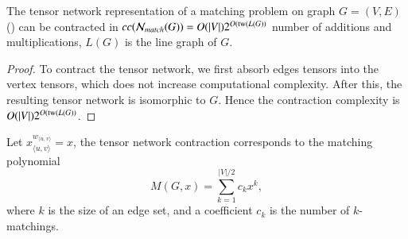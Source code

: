 \documentclass[review, onefignum, onetabnum]{siamart190516}
\begin{document}
\begin{theorem}\label{thm:matchcomplex}
    The tensor network representation of a matching problem on graph $G=(V,E)$ () can be contracted in $cc(\mathcal{N}_{match}(G)) = O(|V|)2^{O({\rm tw}(L(G))}$ number of additions and multiplications, $L(G)$ is the line graph of $G$.
\end{theorem}
\begin{proof}
    To contract the tensor network, we first absorb edges tensors into the vertex tensors, which does not increase computational complexity.
    After this, the resulting tensor network is isomorphic to $G$.
    Hence the contraction complexity is $O(|V|)2^{O({\rm tw}(L(G))}$.
\end{proof}
Let $x_{\langle u,v\rangle}^{w_{\langle u,v\rangle}}=x$, the tensor network contraction corresponds to the matching polynomial
\begin{equation}
    M(G, x) = \sum\limits_{k=1}^{|V|/2} c_k x^k,
\end{equation}
where $k$ is the size of an edge set, and a coefficient $c_k$ is the number of $k$-matchings.
\end{document}
